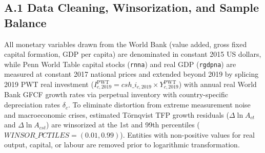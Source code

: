 \documentclass[11pt,a4paper]{article}
\begin{document}
\subsection*{A.1 Data Cleaning, Winsorization, and Sample Balance}
All monetary variables drawn from the World Bank (value added, gross fixed capital formation, GDP per capita) are denominated in constant 2015 US dollars, while Penn World Table capital stocks (\texttt{rnna}) and real GDP (\texttt{rgdpna}) are measured at constant 2017 national prices and extended beyond 2019 by splicing 2019 PWT real investment ($I_{c, 2019}^{\text{PWT}} = csh\_i_{c, 2019} \times Y_{c, 2019}^{\text{PWT}}$) with annual real World Bank GFCF growth rates via perpetual inventory with country-specific depreciation rates $\delta_c$. To eliminate distortion from extreme measurement noise and macroeconomic crises, estimated Törnqvist TFP growth residuals ($\Delta \ln A_{ct}$ and $\Delta \ln A_{cst}$) are winsorized at the 1st and 99th percentiles ($WINSOR\_PCTILES = (0.01, 0.99)$). Entities with non-positive values for real output, capital, or labour are removed prior to logarithmic transformation.
\end{document}
